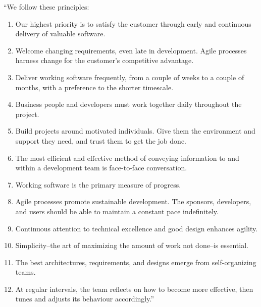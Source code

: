 \begin{displayquote}
``We follow these principles:

\begin{enumerate}
	\item Our highest priority is to satisfy the customer
		through early and continuous delivery
		of valuable software.

	\item Welcome changing requirements, even late in
		development. Agile processes harness change for
		the customer's competitive advantage.

	\item Deliver working software frequently, from a
		couple of weeks to a couple of months, with a
		preference to the shorter timescale.

	\item Business people and developers must work
		together daily throughout the project.

	\item Build projects around motivated individuals.
		Give them the environment and support they need,
		and trust them to get the job done.

	\item The most efficient and effective method of
		conveying information to and within a development
		team is face-to-face conversation.

	\item Working software is the primary measure of progress.

	\item Agile processes promote sustainable development.
		The sponsors, developers, and users should be able
		to maintain a constant pace indefinitely.

	\item Continuous attention to technical excellence
		and good design enhances agility.

	\item Simplicity--the art of maximizing the amount
		of work not done--is essential.

	\item The best architectures, requirements, and designs
		emerge from self-organizing teams.

	\item At regular intervals, the team reflects on how
		to become more effective, then tunes and adjusts
		its behaviour accordingly.''
\end{enumerate}

\end{displayquote}

